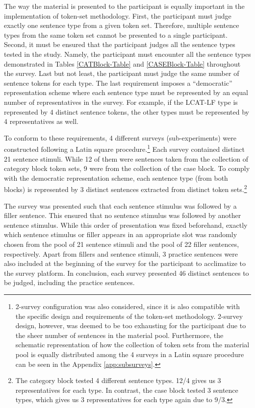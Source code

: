 \begin{sloppypar}
The way the material is presented to the participant is equally important in the implementation of token-set methodology. First, the participant must judge exactly one sentence type from a given token set. Therefore, multiple sentence types from the same token set cannot be presented to a single participant. Second, it must be ensured that the participant judges all the sentence types tested in the study. Namely, the participant must encounter all the sentence types demonstrated in Tables \ref{CATBlock-Table} and \ref{CASEBlock-Table} throughout the survey. Last but not least, the participant must judge the same number of sentence tokens for each type. The last requirement imposes a ``democratic'' representation scheme where each sentence type must be represented by an equal number of representatives in the survey. For example, if the LCAT-LF type is represented by 4 distinct sentence tokens, the other types must be represented by 4 representatives as well. 
\end{sloppypar}

\begin{sloppypar}
To conform to these requirements, 4 different surveys (sub-experiments) were constructed following a Latin square procedure.\footnote{2-survey configuration was also considered, since it is also compatible with the specific design and requirements of the token-set methodology. 2-survey design, however, was deemed to be too exhausting for the participant due to the sheer number of sentences in the material pool. Furthermore, the schematic representation of how the collection of token sets from the material pool is equally distributed among the 4 surveys in a Latin square procedure can be seen in the Appendix \ref{app:subsurveys}.} Each survey contained distinct 21 sentence stimuli. While 12 of them were sentences taken from the collection of category block token sets, 9 were from the collection of the case block. To comply with the democratic representation scheme, each sentence type (from both blocks) is represented by 3 distinct sentences extracted from distinct token sets.\footnote{The category block tested 4 different sentence types. 12/4 gives us 3 representatives for each type. In contrast, the case block tested 3 sentence types, which gives us 3 representatives for each type again due to 9/3.}
\end{sloppypar}

The survey was presented such that each sentence stimulus was followed by a filler sentence. This ensured that no sentence stimulus was followed by another sentence stimulus. While this order of presentation was fixed beforehand, exactly which sentence stimulus or filler appears in an appropriate slot was randomly chosen from the pool of 21 sentence stimuli and the pool of 22 filler sentences, respectively. Apart from fillers and sentence stimuli, 3 practice sentences were also included at the beginning of the survey for the participant to acclimatize to the survey platform. In conclusion, each survey presented 46 distinct sentences to be judged, including the practice sentences.


